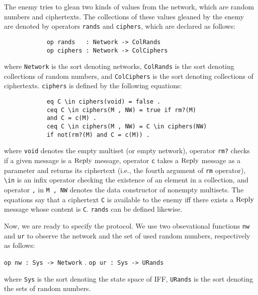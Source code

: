 \documentclass[10pt, conference, compsocconf]{IEEEtran}
\begin{document}
	The enemy tries to glean two kinds of values from the network, which are random numbers and ciphertexts. The collections of these values gleaned by the enemy are denoted by operators \verb!rands! and \verb!ciphers!, which are declared as follows:
	
	\begin{small}
		\begin{verbatim}
			op rands   : Network -> ColRands
			op ciphers : Network -> ColCiphers
		\end{verbatim}
	\end{small}
	
	\noindent
	where \verb!Network! is the sort denoting networks, \verb!ColRands! is the sort denoting collections of random numbers, and \verb!ColCiphers! is the sort denoting collections of ciphertexts. 
	\verb!ciphers! is defined by the following equations:
	
	\begin{small}
		\begin{verbatim}
			eq C \in ciphers(void) = false .
			ceq C \in ciphers(M , NW) = true if rm?(M)
			and C = c(M) .
			ceq C \in ciphers(M , NW) = C \in ciphers(NW) 
			if not(rm?(M) and C = c(M)) .
		\end{verbatim}
	\end{small}
	
	\noindent
	where \verb!void! denotes the empty multiset (or empty network),
	operator \verb!rm?! checks if a given message is a $\rm Reply$ message,
	operator \verb!c! takes a $\rm Reply$ message as a parameter and returns its ciphertext (i.e., the fourth argument of \verb!rm! operator),
	\verb!\in! is an infix operator checking the existence of an element in a collection,
	and operator \verb!,! in \verb!M , NW! denotes the data constructor of nonempty multisets. 
	The equations say that a ciphertext \verb!C! is available to the enemy iff there exists a $\rm Reply$ message whose content is \verb!C!. \verb!rands! can be defined likewise.
	
	Now, we are ready to specify the protocol. We use two obsevational functions \verb!nw! and \verb!ur! to observe the network and the set of used random numbers, respectively as follows:
	
	\smallskip
	\begin{small}
		\noindent
		\verb!op nw : Sys -> Network! . \verb!op ur : Sys -> URands!
	\end{small}
	\smallskip
	
	\noindent
	where \verb!Sys! is the sort denoting the state space of IFF, \verb!URands! is the sort denoting the sets of random numbers.
	
\end{document}
